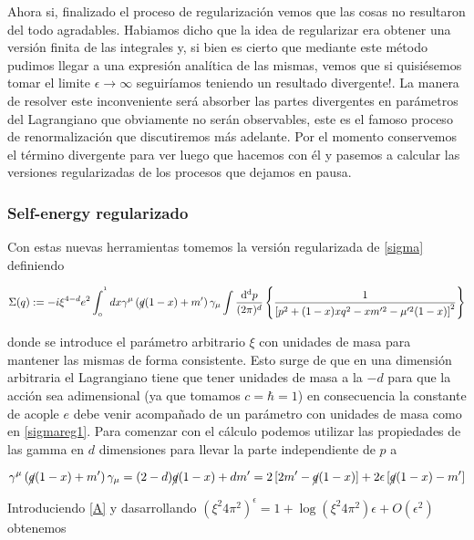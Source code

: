 \documentclass{article}
\numberwithin{equation}{section}
\begin{document}
Ahora si, finalizado el proceso de regularización vemos que las cosas no resultaron del todo agradables. Habiamos dicho que la idea de regularizar era obtener una versión finita de las integrales y, si bien es cierto que mediante este método pudimos llegar a una expresión analítica de las mismas, vemos que si quisiésemos tomar el limite $ \epsilon \longrightarrow \infty $ seguiríamos teniendo un resultado divergente!. La manera de resolver este inconveniente será absorber las partes divergentes en parámetros del Lagrangiano que obviamente no serán observables, este es el famoso proceso de renormalización que discutiremos más adelante. Por el momento conservemos el término divergente para ver luego que hacemos con él y pasemos a calcular las versiones regularizadas de los procesos que dejamos en pausa. 

\subsubsection{Self-energy regularizado}

Con estas nuevas herramientas tomemos la versión regularizada de \ref{sigma} definiendo

\begin{equation}\label{sigmareg1}
\Sigma(q):=-i\xi^{4-d}e^{2}\int_{_{0}}^{^{1}}dx \gamma^{\mu}\left(\cancel{q}(1-x)+m'\right) \gamma_{\mu} \int\frac{\mathrm{d^d}p}{(2\pi)^d}\left\{\frac{1}{\left[p^{2}+(1-x)xq^{2}-xm'^{2}-\mu'^{2}(1-x)\right]^{2}}\right\}
\end{equation}

donde se introduce el parámetro arbitrario $ \xi $ con unidades de masa para mantener las mismas de forma consistente. Esto surge de que en una dimensión arbitraria el Lagrangiano tiene que tener unidades de masa a la $ -d $ para que la acción sea adimensional (ya que tomamos $ c=\hbar=1 $) en consecuencia la constante de acople $ e $ debe venir acompañado de un parámetro con unidades de masa como en \ref{sigmareg1}. Para comenzar con el cálculo podemos utilizar las propiedades de las gamma en $ d $ dimensiones para llevar la parte independiente de $ p $ a

\begin{equation}\label{A}
\gamma^{\mu}\left(\cancel{q}(1-x)+m'\right) \gamma_{\mu} = (2-d)\cancel{q}(1-x)+dm' = 2\left[2m' - \cancel{q}(1-x) \right] + 2\epsilon \left[ \cancel{q}(1-x) - m' \right]
\end{equation}

Introduciendo \ref{A} y dasarrollando $ \left(\xi^2 4 \pi^2\right)^\epsilon = 1 + \log\left(\xi^2 4 \pi^2\right) \epsilon + O(\epsilon^2)$ obtenemos
\end{document}
